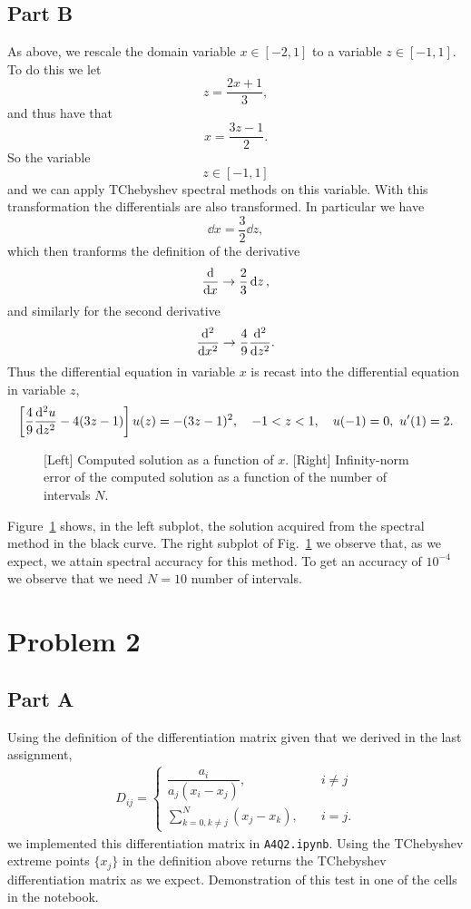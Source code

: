 \documentclass[12pt]{article}
\begin{document}
\subsection*{Part B}

As above, we rescale the domain variable $x\in [-2, 1]$ to a variable $z\in[-1,1]$. To do this we let $$z = \dfrac{2x+1}{3},$$ and thus have that $$x=\dfrac{3z-1}{2}.$$ So the variable $$z\in[-1,1]$$ and we can apply TChebyshev spectral methods on this variable. With this transformation the differentials are also transformed. In particular we have $$\dd{x} = \dfrac{3}{2}\dd{z},$$ which then tranforms the definition of the derivative $$\dv{x}\to \dfrac{2}{3}\dd{z},$$ and similarly for the second derivative $$\dv[2]{x}\to \dfrac{4}{9}\dv[2]{z}.$$ Thus the differential equation in variable $x$ is recast into the differential equation in variable $z$,
\begin{align}
	\left[\dfrac{4}{9}\dv[2]{u}{z} - 4(3z-1)\right]u(z) = -(3z-1)^{2},\quad -1 < z < 1,\quad u(-1) = 0,\ u^{\prime}(1) = 2. 
\end{align}

\begin{figure}[!h]
	\centering
	\caption{[Left] Computed solution as a function of $x$. [Right] Infinity-norm error of the computed solution as a function of the number of intervals $N$.}
	\label{fig:q1b_figure}
\end{figure}

Figure~\ref{fig:q1b_figure} shows, in the left subplot, the solution acquired from the spectral method in the black curve. The right subplot of Fig.~\ref{fig:q1b_figure} we observe that, as we expect, we attain spectral accuracy for this method. To get an accuracy of $10^{-4}$ we observe that we need $N=10$ number of intervals.

\section*{Problem 2}

\subsection*{Part A}

Using the definition of the differentiation matrix given that we derived in the last assignment,
\begin{align}
    D_{ij} = 
    \begin{cases}
        \dfrac{a_{i}}{a_{j}(x_{i}-x_{j})},&\quad i\neq j\\
        \sum\limits_{k=0,k\neq j}^{N}(x_{j}-x_{k}), &\quad i=j.
    \end{cases}    
\end{align}
we implemented this differentiation matrix in \verb|A4Q2.ipynb|. Using the TChebyshev extreme points $\{x_{j}\}$ in the definition above
returns the TChebyshev differentiation matrix as we expect. Demonstration of this test in one of the cells in the notebook.
\end{document}
